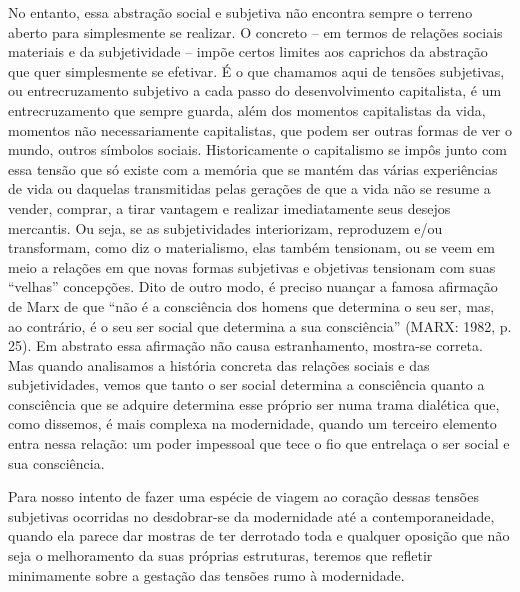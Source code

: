 No entanto, essa abstração social e subjetiva não encontra sempre o
terreno aberto para simplesmente se realizar. O concreto -- em termos de
relações sociais materiais e da subjetividade -- impõe certos limites
aos caprichos da abstração que quer simplesmente se efetivar. É o que
chamamos aqui de tensões subjetivas, ou entrecruzamento subjetivo a cada
passo do desenvolvimento capitalista, é um entrecruzamento que sempre
guarda, além dos momentos capitalistas da vida, momentos não
necessariamente capitalistas, que podem ser outras formas de ver o
mundo, outros símbolos sociais. Historicamente o capitalismo se impôs
junto com essa tensão que só existe com a memória que se mantém das
várias experiências de vida ou daquelas transmitidas pelas gerações de
que a vida não se resume a vender, comprar, a tirar vantagem e realizar
imediatamente seus desejos mercantis. Ou seja, se as subjetividades
interiorizam, reproduzem e/ou transformam, como diz o materialismo, elas
também tensionam, ou se veem em meio a relações em que novas formas
subjetivas e objetivas tensionam com suas ``velhas'' concepções. Dito de
outro modo, é preciso nuançar a famosa afirmação de Marx de que ``não é
a consciência dos homens que determina o seu ser, mas, ao contrário, é o
seu ser social que determina a sua consciência'' (MARX: 1982, p. 25). Em
abstrato essa afirmação não causa estranhamento, mostra-se correta. Mas
quando analisamos a história concreta das relações sociais e das
subjetividades, vemos que tanto o ser social determina a consciência
quanto a consciência que se adquire determina esse próprio ser numa
trama dialética que, como dissemos, é mais complexa na modernidade,
quando um terceiro elemento entra nessa relação: um poder impessoal que
tece o fio que entrelaça o ser social e sua consciência.

Para nosso intento de fazer uma espécie de viagem ao coração dessas
tensões subjetivas ocorridas no desdobrar-se da modernidade até a
contemporaneidade, quando ela parece dar mostras de ter derrotado toda e
qualquer oposição que não seja o melhoramento da suas próprias
estruturas, teremos que refletir minimamente sobre a gestação das
tensões rumo à modernidade.

